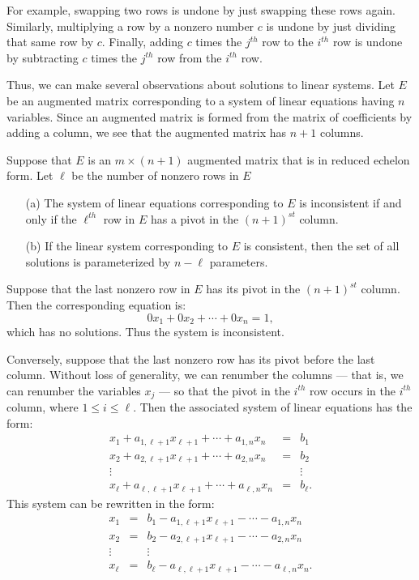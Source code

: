 For example, swapping two rows is undone by just swapping these
rows again.  Similarly, multiplying a row by a nonzero number
$c$ is undone by just dividing that same row by $c$.  Finally,
adding $c$ times the $j^{th}$ row to the $i^{th}$ row is undone
by subtracting $c$ times the $j^{th}$ row from the $i^{th}$ row.

Thus, we can make several observations about solutions to linear
systems.  Let $E$ be an augmented matrix corresponding to a system
of linear equations having $n$ variables.  Since an augmented
matrix is formed from the matrix of coefficients by adding a
column, we see that the augmented matrix has $n+1$ columns.

\begin{thm} \label{number}
Suppose that $E$ is an $m\times(n+1)$ augmented matrix that is in 
reduced echelon form.  Let $\ell$ be the number of nonzero rows in $E$
\begin{enumerate}
\item[(a)] The system of linear equations corresponding to $E$
is inconsistent if and only if the $\ell^{th}$ row in $E$ has a
pivot in the $(n+1)^{st}$ column.
\item[(b)] If the linear system corresponding to $E$ is consistent,
then the set of all solutions is parameterized by $n-\ell$
parameters.
\end{enumerate}  
\end{thm}

\proof  Suppose that the last nonzero row in $E$ has its
pivot in the $(n+1)^{st}$ column. Then the corresponding
equation is:
\[
0x_1 + 0x_2 + \cdots + 0x_n = 1,
\]
which has no solutions.  Thus the system is inconsistent.

Conversely, suppose that the last nonzero row has its pivot
before the last column.  Without loss of generality, we can
renumber the columns --- that is, we can renumber the variables
$x_j$ --- so that the pivot in the $i^{th}$ row occurs in the
$i^{th}$ column, where $1\leq i\leq\ell$.  Then the associated
system of linear equations has the form:
\begin{eqnarray*}
x_1 + a_{1,\ell+1}x_{\ell+1} + \cdots + a_{1,n}x_n & = &  b_1 \\
x_2 + a_{2,\ell+1}x_{\ell+1} + \cdots + a_{2,n}x_n & = &  b_2 \\
\vdots &   &    \vdots  \\
x_\ell + a_{\ell,\ell+1}x_{\ell+1} + \cdots + a_{\ell,n}x_n & = & b_\ell.
\end{eqnarray*}
This system can be rewritten in the form:
\begin{eqnarray}
  x_1  & = &  b_1 - a_{1,\ell+1}x_{\ell+1} - \cdots - a_{1,n}x_n
\nonumber\\
  x_2  & = &  b_2 - a_{2,\ell+1}x_{\ell+1} - \cdots - a_{2,n}x_n
\label{e1-ell}\\
\vdots &   &    \vdots \nonumber \\
x_\ell & = &  b_\ell - a_{\ell,\ell+1}x_{\ell+1} - \cdots -
a_{\ell,n}x_n.
\nonumber
\end{eqnarray}


